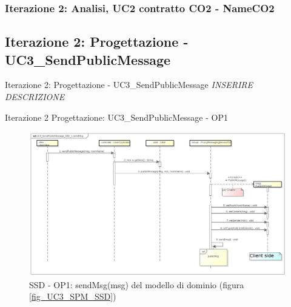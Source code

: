 \documentclass[t]{beamer} %
\begin{document}
\begin{frame}
 \frametitle{Iterazione 2: Analisi, UC2 contratto CO2 - NameCO2}
  \begin{table}[!htbp]
   \caption {UC2 Contratto CO2 - NameCO2}
    \label{table:1}
   \end{table}
\end{frame}

\subsection{Iterazione 2: Progettazione - UC3\_SendPublicMessage}
\begin{frame} {Iterazione 2: Progettazione - UC3\_SendPublicMessage}
  \emph{INSERIRE DESCRIZIONE}
\end{frame}

\begin{frame} {Iterazione 2 Progettazione: UC3\_SendPublicMessage - OP1}
   \begin{figure}
     \includegraphics[scale=0.24]{image_astah/Iteration_2_DesignModel/UC3_SendPublicMessage_SSD_1_sendMsg.png}{\centering}
     \caption{SSD - OP1: sendMsg(msg) del modello di dominio (figura \ref{fig_UC3_SPM_SSD}) }
     \label{fig_UC3_SSD_SRM_1} 
   \end{figure}
\end{frame}
\end{document}
